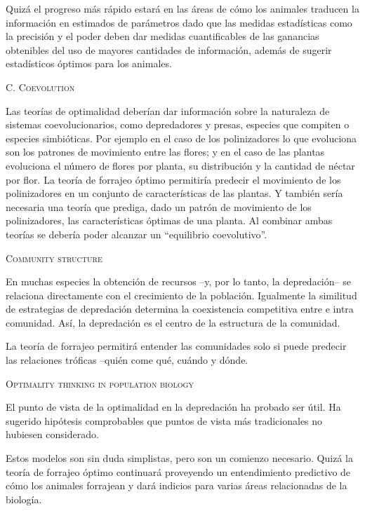 \documentclass[a4paper,12pt]{article}
\begin{document}
Quizá el progreso más rápido estará en las áreas de cómo los animales traducen la información en estimados de parámetros dado que las medidas estadísticas como la precisión y el poder deben dar medidas cuantificables de las ganancias obtenibles del uso de mayores cantidades de información, además de sugerir estadísticos óptimos para los animales.

{\scshape C. Coevolution}

Las teorías de optimalidad deberían dar información sobre la naturaleza de sistemas coevolucionarios, como depredadores y presas, especies que compiten o especies simbióticas. Por ejemplo en el caso de los polinizadores lo que evoluciona son los patrones de movimiento entre las flores; y en el caso de las plantas evoluciona el número de flores por planta, su distribución y la cantidad de néctar por flor. La teoría de forrajeo óptimo permitiría predecir el movimiento de los polinizadores en un conjunto de características de las plantas. Y también sería necesaria una teoría que prediga, dado un patrón de movimiento de los polinizadores, las características óptimas de una planta. Al combinar ambas teorías se debería poder alcanzar un ``equilibrio coevolutivo''. 

{\scshape Community structure}

En muchas especies la obtención de recursos --y, por lo tanto, la depredación-- se relaciona directamente con el crecimiento de la población. Igualmente la similitud de estrategias de depredación determina la coexistencia competitiva entre e intra comunidad. Así, la depredación es el centro de la estructura de la comunidad.

La teoría de forrajeo permitirá entender las comunidades solo si puede predecir las relaciones tróficas --quién come qué, cuándo y dónde.

{\scshape Optimality thinking in population biology}

El punto de vista de la optimalidad en la depredación ha probado ser útil. Ha sugerido hipótesis comprobables que puntos de vista más tradicionales no hubiesen considerado.

Estos modelos son sin duda simplistas, pero son un comienzo necesario. Quizá la teoría de forrajeo óptimo continuará proveyendo un entendimiento predictivo de cómo los animales forrajean y dará indicios para varias áreas relacionadas de la biología.
\end{document}
